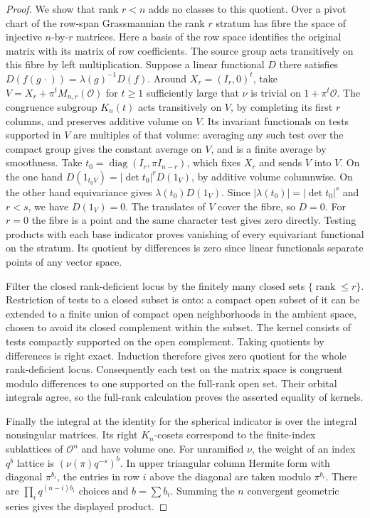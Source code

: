 \begin{proof}
We show that rank \(r<n\) adds no classes to this quotient. Over
a pivot chart of the row-span Grassmannian the rank \(r\) stratum has
fibre the space of injective \(n\)-by-\(r\) matrices. Here a basis of
the row space identifies the original matrix with its matrix of row
coefficients. The source group acts transitively on this fibre by left
multiplication. Suppose a linear functional \(D\) there satisfies
\(D(f(g\,\cdot))=\lambda(g)^{-1}D(f)\).
Around \(X_r=(I_r,0)^t\), take
\(V=X_r+\pi^t M_{n,r}(\mathcal O)\) for \(t\ge1\) sufficiently large
that \(\nu\) is trivial on \(1+\pi^t\mathcal O\). The congruence
subgroup \(K_n(t)\) acts transitively on \(V\), by completing its
first \(r\) columns, and preserves additive volume on \(V\).
Its invariant functionals on tests supported in \(V\) are multiples of
that volume: averaging any such test over the compact group gives the
constant average on \(V\), and is a finite average by smoothness.
Take \(t_0=\operatorname{diag}(I_r,\pi I_{n-r})\), which fixes \(X_r\)
and sends \(V\) into \(V\). On the one hand
\(D(1_{t_0V})=|\det t_0|^r D(1_V)\), by additive volume columnwise.
On the other hand equivariance gives \(\lambda(t_0)D(1_V)\).
Since \(|\lambda(t_0)|=|\det t_0|^s\) and \(r<s\), we have \(D(1_V)=0\).
The translates of \(V\) cover the fibre, so \(D=0\). For \(r=0\)
the fibre is a point and the same character test gives zero directly.
Testing products with each base indicator proves vanishing of every
equivariant functional on the stratum. Its quotient by differences
is zero since linear functionals separate points of any vector space.

Filter the closed rank-deficient locus by the finitely many closed
sets \(\{\operatorname{rank}\le r\}\). Restriction of tests to a closed
subset is onto: a compact open subset of it can be extended to a finite
union of compact open neighborhoods in the ambient space, chosen to
avoid its closed complement within the subset. The kernel consists of
tests compactly supported on the open complement. Taking quotients by
differences is right exact. Induction therefore gives zero quotient for
the whole rank-deficient locus. Consequently each test on the matrix
space is congruent modulo differences to one supported on the full-rank
open set. Their orbital integrals agree, so the full-rank calculation
proves the asserted equality of kernels.

Finally the integral at the identity for the spherical indicator is over
the integral nonsingular matrices. Its right \(K_n\)-cosets correspond
to the finite-index sublattices of \(\mathcal O^n\) and have volume one.
For unramified \(\nu\), the weight of an index \(q^b\) lattice is
\((\nu(\pi)q^{-s})^b\). In upper triangular column Hermite form with
diagonal \(\pi^{b_i}\), the entries in row \(i\) above the diagonal
are taken modulo \(\pi^{b_i}\). There are
\(\prod_i q^{(n-i)b_i}\) choices and \(b=\sum b_i\).
Summing the \(n\) convergent geometric series gives the displayed product.
\end{proof}
